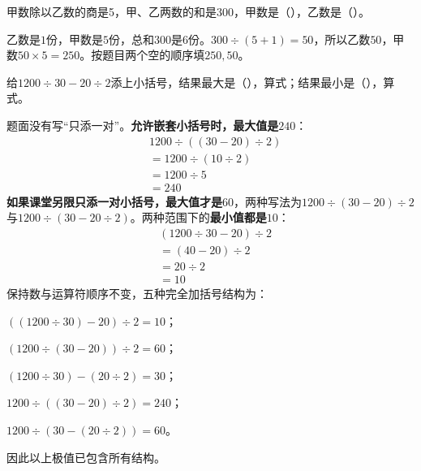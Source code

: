 甲数除以乙数的商是5，甲、乙两数的和是300，甲数是（\hspace{1.8em}），乙数是（\hspace{1.8em}）。\par
\begin{BookAnswer}
乙数是\(1\)份，甲数是\(5\)份，总和\(300\)是\(6\)份。\(300\div(5+1)=50\)，所以乙数\(50\)，甲数\(50\times5=250\)。按题目两个空的顺序填\(250,50\)。
\end{BookAnswer}

给\(1200\div30-20\div2\)添上小括号，结果最大是（\hspace{1.8em}），算式\BookBlank{}；结果最小是（\hspace{1.8em}），算式\BookBlank{}。\par
\begin{BookAnswer}
题面没有写“只添一对”。\textbf{允许嵌套小括号时，最大值是\(240\)}：\[\begin{aligned}&1200\div((30-20)\div2)\\&=1200\div(10\div2)\\&=1200\div5\\&=240\end{aligned}\]\textbf{如果课堂另限只添一对小括号，最大值才是\(60\)}，两种写法为\(1200\div(30-20)\div2\)与\(1200\div(30-20\div2)\)。两种范围下的\textbf{最小值都是\(10\)}：\[\begin{aligned}&(1200\div30-20)\div2\\&=(40-20)\div2\\&=20\div2\\&=10\end{aligned}\]保持数与运算符顺序不变，五种完全加括号结构为：\par \(((1200\div30)-20)\div2=10\)；\par \((1200\div(30-20))\div2=60\)；\par \((1200\div30)-(20\div2)=30\)；\par \(1200\div((30-20)\div2)=240\)；\par \(1200\div(30-(20\div2))=60\)。\par 因此以上极值已包含所有结构。
\end{BookAnswer}
